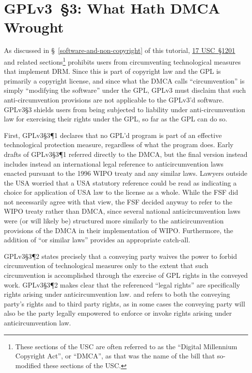 \section{GPLv3~\S3: What Hath DMCA Wrought}
\label{GPLv3s3}

As discussed in \S~\ref{software-and-non-copyright} of this tutorial,
\href{http://www.law.cornell.edu/uscode/text/17/1201}{17 USC~\S1201} and
related sections\footnote{These sections of the USC are often referred to as
  the ``Digital Millennium Copyright Act'', or ``DMCA'', as that was the name
  of the bill that so-modified these sections of the USC\@.} prohibits users
from circumventing technological measures that implement DRM\@.  Since this
is part of copyright law and the GPL is primarily a copyright license, and
since what the DMCA calls ``circumvention'' is simply ``modifying the
software'' under the GPL, GPLv3 must disclaim that such anti-circumvention
provisions are not applicable to the GPLv3'd software.  GPLv3\S3 shields
users from being subjected to liability under anti-circumvention law for
exercising their rights under the GPL, so far as the GPL can do so.

First, GPLv3\S3\P1 declares that no GPL'd program is part of an effective
technological protection measure, regardless of what the program does.  Early
drafts of GPLv3\S3\P1 referred directly to the DMCA, but the final version
instead includes instead an international legal reference to
anticircumvention laws enacted pursuant to the 1996 WIPO treaty and any
similar laws.  Lawyers outside the USA worried that a USA statutory reference
could be read as indicating a choice for application of USA law to the
license as a whole.  While the FSF did not necessarily agree with that view,
the FSF decided anyway to refer to the WIPO treaty rather than DMCA, since
several national anticircumvention laws were (or will likely be) structured
more similarly to the anticircumvention provisions of the DMCA in their
implementation of WIPO\@.  Furthermore, the addition of ``or similar laws''
provides an appropriate catch-all.

GPLv3\S3\P2 states precisely that a conveying party waives the
power to forbid circumvention of technological measures only to the extent
that such circumvention is accomplished through the exercise of GPL rights in
the conveyed work.  GPLv3\S3\P2 makes clear that the referenced ``legal
rights'' are specifically rights arising under anticircumvention law.  and
refers to both the conveying party's rights and to third party rights, as in
some cases the conveying party will also be the party legally empowered to
enforce or invoke rights arising under anticircumvention law.

